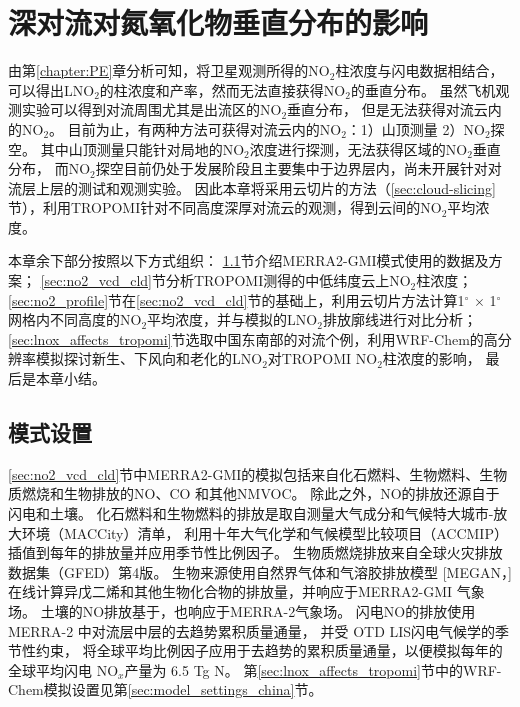 
\chapter{深对流对氮氧化物垂直分布的影响} \label{sec:effects_on_nox_profile}

由第\ref{chapter:PE}章分析可知，将卫星观测所得的NO$_2$柱浓度与闪电数据相结合，
可以得出LNO$_2$的柱浓度和产率，然而无法直接获得NO$_2$的垂直分布。
虽然飞机观测实验可以得到对流周围尤其是出流区的NO$_2$垂直分布\citep{Barth.2019}，
但是无法获得对流云内的NO$_2$。
目前为止，有两种方法可获得对流云内的NO$_2$：1）山顶测量 2）NO$_2$探空。
其中山顶测量只能针对局地的NO$_2$浓度进行探测，无法获得区域的NO$_2$垂直分布\citep{Reiter.1970}，
而NO$_2$探空目前仍处于发展阶段且主要集中于边界层内\citep{Sluis.2010}，尚未开展针对对流层上层的测试和观测实验。
因此本章将采用云切片的方法（\ref{sec:cloud-slicing}节），利用TROPOMI针对不同高度深厚对流云的观测，得到云间的NO$_2$平均浓度。

本章余下部分按照以下方式组织：
\ref{sec:model_settings_gmi}节介绍MERRA2-GMI模式使用的数据及方案；
\ref{sec:no2_vcd_cld}节分析TROPOMI测得的中低纬度云上NO$_2$柱浓度；
\ref{sec:no2_profile}节在\ref{sec:no2_vcd_cld}节的基础上，利用云切片方法计算1$^{\circ}$ $\times$ 1$^{\circ}$ 网格内不同高度的NO$_2$平均浓度，并与模拟的LNO$_2$排放廓线进行对比分析；
\ref{sec:lnox_affects_tropomi}节选取中国东南部的对流个例，利用WRF-Chem的高分辨率模拟探讨新生、下风向和老化的LNO$_2$对TROPOMI NO$_2$柱浓度的影响，
最后是本章小结。



\section{模式设置} \label{sec:model_settings_gmi}

\ref{sec:no2_vcd_cld}节中MERRA2-GMI的模拟包括来自化石燃料、生物燃料、生物质燃烧和生物排放的NO、CO 和其他NMVOC。
除此之外，NO的排放还源自于闪电和土壤。
化石燃料和生物燃料的排放是取自测量大气成分和气候特大城市-放大环境（MACCity）清单\citep{Granier.2011}，
利用十年大气化学和气候模型比较项目（ACCMIP）插值到每年的排放量并应用季节性比例因子\citep{Lamarque.2010}。
生物质燃烧排放来自全球火灾排放数据集（GFED）第4版\citep{Giglio.2013}。
生物来源使用自然界气体和气溶胶排放模型 [MEGAN，\citet{Guenther.1999}]
在线计算异戊二烯和其他生物化合物的排放量，并响应于MERRA2-GMI 气象场。
土壤的NO排放基于\citet{Yienger.1995}，也响应于MERRA-2气象场。
闪电NO的排放使用 MERRA-2 中对流层中层的去趋势累积质量通量\citep{Allen.2010}，
并受 OTD LIS闪电气候学的季节性约束\citep{Cecil.2014}，
将全球平均比例因子应用于去趋势的累积质量通量，以便模拟每年的全球平均闪电 NO$_x$产量为 6.5 Tg N。
第\ref{sec:lnox_affects_tropomi}节中的WRF-Chem模拟设置见第\ref{sec:model_settings_china}节。

